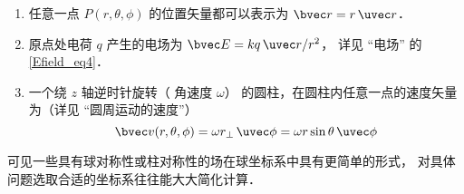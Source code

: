 \begin{example}{}
\begin{enumerate}
\item 任意一点 $P(r, \theta, \phi)$ 的位置矢量都可以表示为 $\bvec r = r\,\uvec r$．
\item 原点处电荷 $q$ 产生的电场为 $\bvec E = k q \,\uvec r/r^2$， 详见 “电场” 的\autoref{Efield_eq4}．
\item 一个绕 $z$ 轴逆时针旋转（ 角速度 $\omega $） 的圆柱，在圆柱内任意一点的速度矢量为（详见 “圆周运动的速度”）
\begin{equation}
\bvec v(r, \theta, \phi) = \omega r_\bot \,\uvec \phi = \omega r\sin \theta \,\uvec \phi 
\end{equation}
\end{enumerate}
可见一些具有球对称性或柱对称性的场在球坐标系中具有更简单的形式， 对具体问题选取合适的坐标系往往能大大简化计算．
\end{example}
